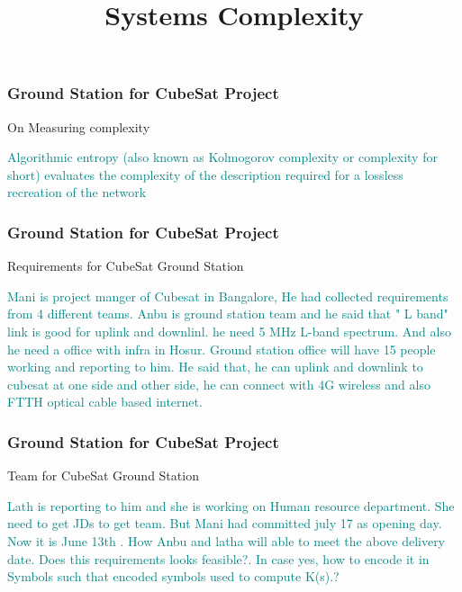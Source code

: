 

\title[Systems Engineering]{Systems Complexity } 





\newpage
\begin{frame}
\frametitle{Ground Station for CubeSat Project }
\begin{block}{On Measuring complexity}

\textcolor{teal}{
Algorithmic entropy (also known as Kolmogorov complexity or complexity for short) evaluates the complexity of the description required for a lossless recreation of the network}


 
\end{block}
\end{frame}


\newpage
\begin{frame}
\frametitle{Ground Station for CubeSat Project }
\begin{block}{Requirements for CubeSat Ground Station}

\textcolor{teal}{
Mani is project manger of Cubesat in Bangalore, He had collected requirements from 4 different teams.   Anbu is ground station team and he said that " L band" link is good for uplink and downlinl. he need 5 MHz L-band spectrum. And also he need a office with infra in Hosur. Ground station office will have 15 people working and reporting to him. He said that, he can uplink and downlink to cubesat at one side and other side, he can connect with 4G wireless and also  FTTH  optical cable based internet.  }

 
\end{block}
\end{frame}


\newpage
\begin{frame}
\frametitle{Ground Station for CubeSat Project }
\begin{block}{ Team for CubeSat Ground Station}

 \textcolor{teal}{
 Lath is reporting to him and she is working on Human resource department. She need to get JDs  to get team.  But Mani had committed july 17 as opening day. Now it is June 13th . How Anbu  and latha will able to meet the above delivery date.   Does this requirements looks feasible?.  In case yes, how to encode it in Symbols such that  encoded symbols used to compute K(s).?}

\end{block}
\end{frame}


